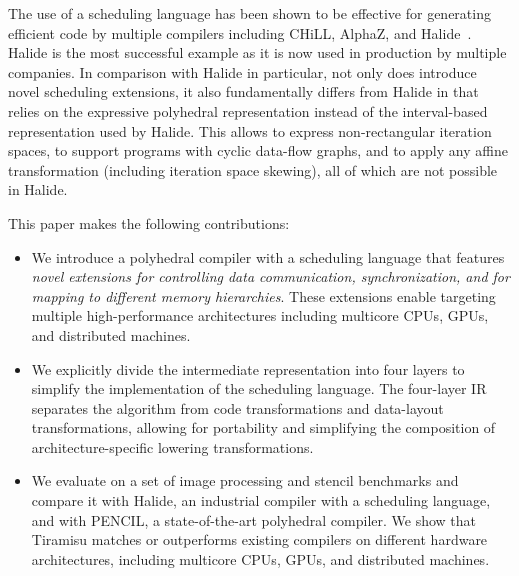 The use of a scheduling language has been shown to be effective for generating efficient code by multiple compilers including CHiLL, AlphaZ, and Halide~\cite{halide_12,DBLP:conf/pldi/Ragan-KelleyBAPDA13}. Halide is the most successful example as it is now used in production by multiple companies.
In comparison with Halide in particular, not only does \framework{} introduce novel scheduling extensions, it also fundamentally differs from Halide in that \framework{} relies on the expressive polyhedral representation instead of the interval-based representation used by Halide.  This allows \framework{} to express non-rectangular iteration spaces, to support programs with cyclic data-flow graphs, and to apply any affine transformation (including iteration space skewing), all of which are not possible in Halide.

This paper makes the following contributions:

\begin{itemize}
  \item We introduce a polyhedral compiler with a scheduling language that features \emph{novel extensions for controlling data communication, synchronization, and for mapping to different memory hierarchies}.  These extensions enable targeting multiple high-performance architectures including multicore CPUs, GPUs, and distributed machines.

  \item We explicitly divide the intermediate representation into four layers to simplify the implementation of the scheduling language.  The four-layer IR separates the algorithm from code transformations and data-layout transformations, allowing for portability and simplifying the composition of architecture-specific lowering transformations.

  \item We evaluate \framework{} on a set of image processing and stencil benchmarks and compare it with Halide, an industrial compiler with a scheduling language, and with PENCIL, a state-of-the-art polyhedral compiler.  We show that Tiramisu matches or outperforms existing compilers on different hardware architectures, including multicore CPUs, GPUs, and distributed machines.
\end{itemize}

